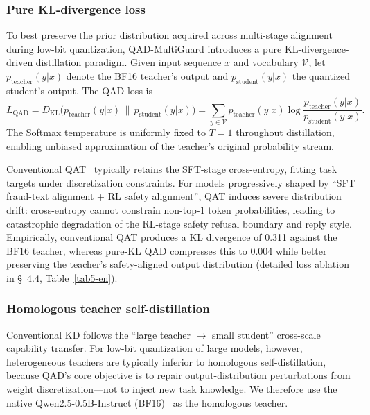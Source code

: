 \documentclass[11pt, a4paper]{article}
\begin{document}
\subsubsection{Pure KL-divergence loss}

To best preserve the prior distribution acquired across multi-stage alignment during low-bit quantization, QAD-MultiGuard introduces a pure KL-divergence-driven distillation paradigm. Given input sequence $x$ and vocabulary $\mathcal{V}$, let $p_{\text{teacher}}(y|x)$ denote the BF16 teacher's output and $p_{\text{student}}(y|x)$ the quantized student's output. The QAD loss is
\begin{equation}
L_{\mathrm{QAD}} = D_{\mathrm{KL}}\!\bigl( p_{\text{teacher}}(y|x)\,\|\,p_{\text{student}}(y|x) \bigr) = \sum_{y\in\mathcal{V}} p_{\text{teacher}}(y|x)\log\!\frac{p_{\text{teacher}}(y|x)}{p_{\text{student}}(y|x)}.
\end{equation}
The Softmax temperature is uniformly fixed to $T = 1$ throughout distillation, enabling unbiased approximation of the teacher's original probability stream.

Conventional QAT~\cite{24,25,26} typically retains the SFT-stage cross-entropy, fitting task targets under discretization constraints. For models progressively shaped by ``SFT fraud-text alignment + RL safety alignment'', QAT induces severe distribution drift: cross-entropy cannot constrain non-top-1 token probabilities, leading to catastrophic degradation of the RL-stage safety refusal boundary and reply style. Empirically, conventional QAT produces a KL divergence of 0.311 against the BF16 teacher, whereas pure-KL QAD compresses this to 0.004 while better preserving the teacher's safety-aligned output distribution (detailed loss ablation in \S~4.4, Table~\ref{tab5-en}).

\subsubsection{Homologous teacher self-distillation}

Conventional KD follows the ``large teacher $\rightarrow$ small student'' cross-scale capability transfer. For low-bit quantization of large models, however, heterogeneous teachers are typically inferior to homologous self-distillation, because QAD's core objective is to repair output-distribution perturbations from weight discretization---not to inject new task knowledge. We therefore use the native Qwen2.5-0.5B-Instruct (BF16)~\cite{27,28,29} as the homologous teacher.
\end{document}
